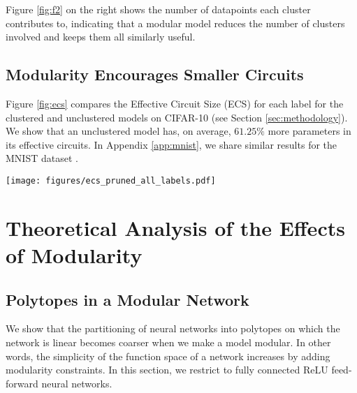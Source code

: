 Figure \ref{fig:f2} on the right shows the number of datapoints each cluster contributes to, indicating that a modular model reduces the number of clusters involved and keeps them all similarly useful.




\subsection{Modularity Encourages Smaller Circuits}\label{sec:circuit-size}

Figure \ref{fig:ecs} compares the Effective Circuit Size (ECS) for each label for the clustered and unclustered models on CIFAR-10 (see Section \ref{sec:methodology}). We show that an unclustered model has, on average, $61.25\%$ more parameters in its effective circuits. In Appendix \ref{app:mnist}, we share similar results for the MNIST dataset \citep{deng2012mnist}.

\begin{figure*}[t]
    \centering
    \texttt{[image: figures/ecs\_pruned\_all\_labels.pdf]}
    \caption{Percentage increase in Effective Circuit Size (ECS) for each label (as a fraction of the whole model) from the clustered to the unclustered models. Larger arrows denote a larger change in ECS.}
    \label{fig:ecs}
\end{figure*}

\section{Theoretical Analysis of the Effects of Modularity}\label{sec:theoretical}


\subsection{Polytopes in a Modular Network}

We show that the partitioning of neural networks into polytopes on which the network is linear \citep{sudjianto2020unwrapping} becomes coarser when we make a model modular. In other words, the simplicity of the function space of a network increases by adding modularity constraints. In this section, we restrict to fully connected ReLU feed-forward neural networks. 

